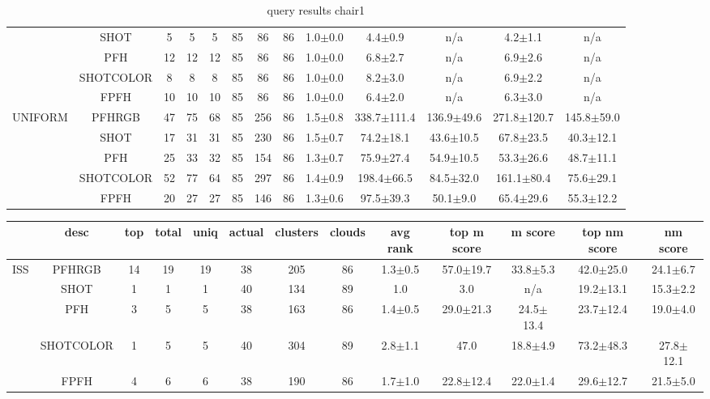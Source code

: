 \documentclass[11pt,a4paper]{kth-mag}
\begin{document}
\begin{landscape}
\begin{table}
\begin{tabular}{cc|ccccccccccc}
      &SHOT & 5 & 5 & 5 & 85 & 86 & 86 & 1.0$\pm$0.0 & 4.4$\pm$0.9 & n/a & 4.2$\pm$1.1 & n/a\\
      &PFH & 12 & 12 & 12 & 85 & 86 & 86 & 1.0$\pm$0.0 & 6.8$\pm$2.7 & n/a & 6.9$\pm$2.6 & n/a\\
      &SHOTCOLOR & 8 & 8 & 8 & 85 & 86 & 86 & 1.0$\pm$0.0 & 8.2$\pm$3.0 & n/a & 6.9$\pm$2.2 & n/a\\
      &FPFH & 10 & 10 & 10 & 85 & 86 & 86 & 1.0$\pm$0.0 & 6.4$\pm$2.0 & n/a & 6.3$\pm$3.0 & n/a\\
      \hline\multirow{5}{*}{UNIFORM} & PFHRGB & 47 & 75 & 68 & 85 & 256 & 86 & 1.5$\pm$0.8 & 338.7$\pm$111.4 & 136.9$\pm$49.6 & 271.8$\pm$120.7 & 145.8$\pm$59.0\\
      &SHOT & 17 & 31 & 31 & 85 & 230 & 86 & 1.5$\pm$0.7 & 74.2$\pm$18.1 & 43.6$\pm$10.5 & 67.8$\pm$23.5 & 40.3$\pm$12.1\\
      &PFH & 25 & 33 & 32 & 85 & 154 & 86 & 1.3$\pm$0.7 & 75.9$\pm$27.4 & 54.9$\pm$10.5 & 53.3$\pm$26.6 & 48.7$\pm$11.1\\
      &SHOTCOLOR & 52 & 77 & 64 & 85 & 297 & 86 & 1.4$\pm$0.9 & 198.4$\pm$66.5 & 84.5$\pm$32.0 & 161.1$\pm$80.4 & 75.6$\pm$29.1\\
      &FPFH & 20 & 27 & 27 & 85 & 146 & 86 & 1.3$\pm$0.6 & 97.5$\pm$39.3 & 50.1$\pm$9.0 & 65.4$\pm$29.6 & 55.3$\pm$12.2\\
    \end{tabular}
    \caption{query results chair1}
    \label{tab:qchair1}
  \end{table}
  \begin{table}
    \begin{tabular}{cc|ccccccccccc}
      & desc & top & total & uniq & actual & clusters & clouds & avg rank & top m score & m score & top nm score & nm score\\\hline
      \multirow{5}{*}{ISS} & PFHRGB & 14 & 19 & 19 & 38 & 205 & 86 & 1.3$\pm$0.5 & 57.0$\pm$19.7 & 33.8$\pm$5.3 & 42.0$\pm$25.0 & 24.1$\pm$6.7\\
      &SHOT & 1 & 1 & 1 & 40 & 134 & 89 & 1.0 & 3.0 & n/a & 19.2$\pm$13.1 & 15.3$\pm$2.2\\
      &PFH & 3 & 5 & 5 & 38 & 163 & 86 & 1.4$\pm$0.5 & 29.0$\pm$21.3 & 24.5$\pm$13.4 & 23.7$\pm$12.4 & 19.0$\pm$4.0\\
      &SHOTCOLOR & 1 & 5 & 5 & 40 & 304 & 89 & 2.8$\pm$1.1 & 47.0 & 18.8$\pm$4.9 & 73.2$\pm$48.3 & 27.8$\pm$12.1\\
      &FPFH & 4 & 6 & 6 & 38 & 190 & 86 & 1.7$\pm$1.0 & 22.8$\pm$12.4 & 22.0$\pm$1.4 & 29.6$\pm$12.7 & 21.5$\pm$5.0\\

\end{tabular}
\end{table}
\end{landscape}
\end{document}
